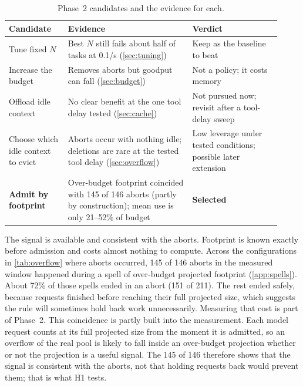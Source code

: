 \begin{table}[t]
  \centering\small
  \begin{tabular}{p{0.2\linewidth}p{0.42\linewidth}p{0.3\linewidth}}
    \toprule
    Candidate & Evidence & Verdict \\
    \midrule
    Tune fixed $N$ & Best $N$ still fails about half of tasks at 0.1/s (\cref{sec:tuning}) & Keep as the baseline to beat \\
    Increase the budget & Removes aborts but goodput can fall (\cref{sec:budget}) & Not a policy; it costs memory \\
    Offload idle context & No clear benefit at the one tool delay tested (\cref{sec:cache}) & Not pursued now; revisit after a tool-delay sweep \\
    Choose which idle context to evict & Aborts occur with nothing idle; deletions are rare at the tested tool delay (\cref{sec:overflow}) & Low leverage under tested conditions; possible later extension \\
    \textbf{Admit by footprint} & Over-budget footprint coincided with 145 of 146 aborts (partly by construction); mean use is only 21--52\% of budget & \textbf{Selected} \\
    \bottomrule
  \end{tabular}
  \caption{Phase~2 candidates and the evidence for each.}
  \label{tab:candidates}
\end{table}

The signal is available and consistent with the aborts. Footprint is known exactly before admission and costs almost nothing to compute. Across the configurations in \cref{tab:overflow} where aborts occurred, 145 of 146 aborts in the measured window happened during a spell of over-budget projected footprint (\cref{app:spells}). About 72\% of those spells ended in an abort (151 of 211). The rest ended safely, because requests finished before reaching their full projected size, which suggests the rule will sometimes hold back work unnecessarily. Measuring that cost is part of Phase~2. This coincidence is partly built into the measurement. Each model request counts at its full projected size from the moment it is admitted, so an overflow of the real pool is likely to fall inside an over-budget projection whether or not the projection is a useful signal. The 145 of 146 therefore shows that the signal is consistent with the aborts, not that holding requests back would prevent them; that is what H1 tests.

